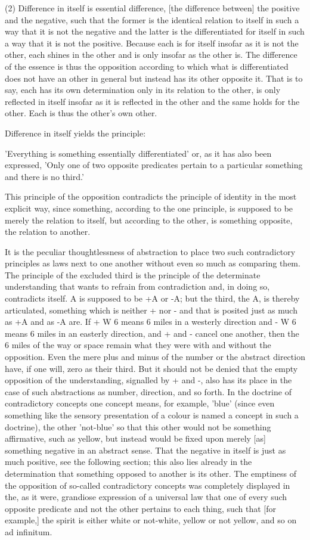 (2) Difference in itself is essential difference,
[the difference between] the positive and the negative,
such that the former is the identical relation to itself
in such a way that it is not the negative and
the latter is the differentiated for itself
in such a way that it is not the positive.
Because each is for itself insofar as it is not the other,
each shines in the other and is only insofar as the other is.
The difference of the essence is thus the opposition
according to which what is differentiated does not have
an other in general but instead has its other opposite it.
That is to say, each has its own determination
only in its relation to the other,
is only reflected in itself insofar as
it is reflected in the other
and the same holds for the other.
Each is thus the other's own other.

Difference in itself yields the principle:

'Everything is something essentially differentiated'
or, as it has also been expressed,
'Only one of two opposite predicates pertain to
a particular something and there is no third.'

This principle of the opposition contradicts
the principle of identity in the most explicit way,
since something, according to the one principle,
is supposed to be merely the relation to itself,
but according to the other, is something opposite,
the relation to another.

It is the peculiar thoughtlessness of abstraction to place
two such contradictory principles as laws next to one another
without even so much as comparing them.
The principle of the excluded third is the
principle of the determinate understanding
that wants to refrain from contradiction
and, in doing so, contradicts itself.
A is supposed to be +A or -A;
but the third, the A, is thereby articulated,
something which is neither + nor -
and that is posited just as much
as +A and as -A are.
If + W 6 means 6 miles in a westerly direction
and - W 6 means 6 miles in an easterly direction,
and + and - cancel one another, then the 6 miles of the way or
space remain what they were with and without the opposition.
Even the mere plus and minus of the number or the abstract direction
have, if one will, zero as their third.
But it should not be denied that the empty opposition of the understanding,
signalled by + and -, also has its place in the case of such abstractions
as number, direction, and so forth.
In the doctrine of contradictory concepts one concept means,
for example, 'blue' (since even something like the sensory presentation
of a colour is named a concept in such a doctrine),
the other 'not-blue' so that this other would not be something affirmative,
such as yellow, but instead would be fixed upon merely [as]
something negative in an abstract sense.
That the negative in itself is just as much positive,
see the following section; this also lies already
in the determination that something opposed to
another is its other.
The emptiness of the opposition of so-called
contradictory concepts was completely displayed in the, as it were,
grandiose expression of a universal law that one of every such
opposite predicate and not the other pertains to each thing, such
that [for example,] the spirit is either white or not-white,
yellow or not yellow, and so on ad infinitum.

